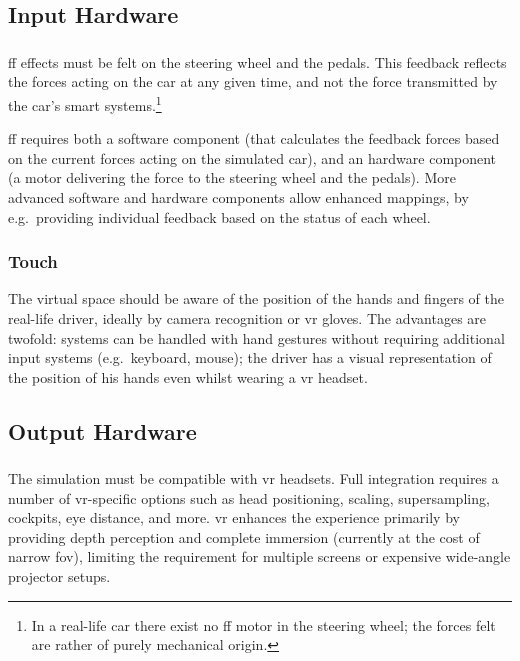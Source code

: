 \subsection{Input Hardware}

\subsubsection{}

\gls{ff} effects must be felt on the steering wheel and the pedals. This feedback reflects the forces acting on the car at any given time, and not the force transmitted by the car's smart systems.\footnote{In a real-life car there exist no \gls{ff} motor in the steering wheel; the forces felt are rather of purely mechanical origin.}

\gls{ff} requires both a software component (that calculates the feedback forces based on the current forces acting on the simulated car), and an hardware component (a motor delivering the force to the steering wheel and the pedals). More advanced software and hardware components allow enhanced mappings, by e.g.\ providing individual feedback based on the status of each wheel.

\subsubsection{Touch}

The virtual  space should be aware of the position of the hands and fingers of the real-life driver, ideally by camera recognition or \gls{vr} gloves. The advantages are twofold: systems can be handled with hand gestures without requiring additional input systems (e.g.\ keyboard, mouse); the driver has a visual representation of the position of his hands even whilst wearing a \gls{vr} headset.

\subsection{Output Hardware}

\subsubsection{}

The simulation must be compatible with \gls{vr} headsets. Full integration requires a number of \gls{vr}-specific options such as head positioning, scaling, supersampling,  cockpits, eye distance, and more. \gls{vr} enhances the experience primarily by providing depth perception and complete immersion (currently at the cost of narrow \gls{fov}), limiting the requirement for multiple screens or expensive wide-angle projector setups.

